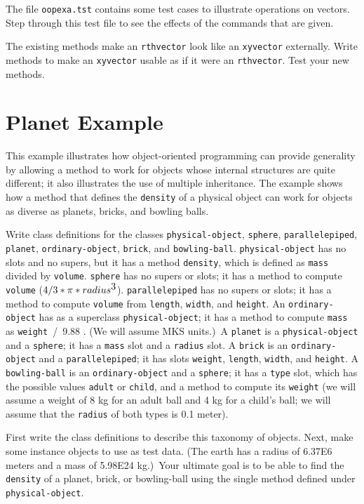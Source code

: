 The file {\tt oopexa.tst} contains some test cases to illustrate operations
on vectors.  Step through this test file to see the effects of the commands
that are given.

The existing methods make an {\tt rthvector} look like an {\tt xyvector}
externally.  Write methods to make an {\tt xyvector} usable as if it
were an {\tt rthvector}.  Test your new methods.

\section{Planet Example}

This example illustrates how object-oriented programming can
provide generality by allowing a method to work for objects whose
internal structures are quite different; it also illustrates the use of
multiple inheritance.  The example shows how a
method that defines the {\tt density} of a physical object can work
for objects as diverse as planets, bricks, and bowling balls.

Write class definitions for the classes {\tt physical-object}, {\tt sphere},
{\tt parallelepiped}, {\tt planet}, {\tt ordinary-object}, {\tt brick}, and
{\tt bowling-ball}.  {\tt physical-object} has no slots and no supers, but
it has a method {\tt density}, which is defined as {\tt mass} divided by
{\tt volume}.  {\tt sphere} has no supers or slots; it has
a method to compute {\tt volume} ($ 4/3 * \pi * radius^{\hbox{3}} $).
{\tt parallelepiped} has no supers or slots; it has a method to compute
{\tt volume} from {\tt length}, {\tt width}, and {\tt height}.  An
{\tt ordinary-object} has as a superclass {\tt physical-object}; it has a
method to compute {\tt mass} as {\tt weight}\ /\ 9.88 .  (We will assume
MKS units.)\  A {\tt planet} is a {\tt physical-object} and a {\tt sphere};
it has a {\tt mass} slot and a {\tt radius} slot.  A {\tt brick} is an
{\tt ordinary-object} and a {\tt parallelepiped}; it has slots {\tt weight},
{\tt length}, {\tt width}, and {\tt height}.  A {\tt bowling-ball}
is an {\tt ordinary-object} and a {\tt sphere}; it has a {\tt type} slot,
which has the possible values {\tt adult} or {\tt child}, and a method to
compute its {\tt weight} (we will assume a weight of 8 kg for an adult ball
and 4 kg for a child's ball; we will assume that the {\tt radius} of both
types is 0.1 meter).

First write the class definitions to describe this taxonomy of objects.
Next, make some instance objects to use as test data.  (The earth has a
radius of 6.37E6 meters and a mass of 5.98E24 kg.)\  Your ultimate goal
is to be able to find the {\tt density} of a planet, brick, or bowling-ball
using the single method defined under {\tt physical-object}.

